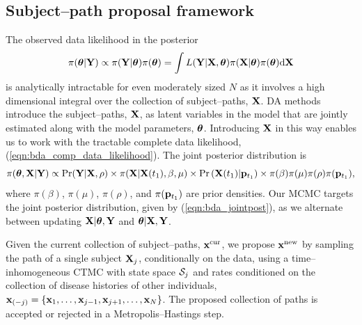 \subsection{Subject--path proposal framework}
\label{subsec:bda_subj_proc}
The observed data likelihood in the posterior  $$ \pi(\boldsymbol{\theta}|\mathbf{Y}) \propto \pi(\mathbf{Y}|\boldsymbol{\theta})\pi(\boldsymbol{\theta})=\int L(\mathbf{Y}|\mathbf{X}, \boldsymbol{\theta}) \pi(\mathbf{X}|\boldsymbol{\theta}) \pi(\boldsymbol{\theta}) \mathrm{d}\mathbf{X}$$
is analytically intractable for even moderately sized $ N $ as it involves a  high dimensional integral over the collection of subject--paths, $ \mathbf{X} $. DA methods introduce the subject--paths, $ \mathbf{X} $, as latent variables in the model that are jointly estimated along with the model parameters, $ \boldsymbol{\theta} $. Introducing $ \mathbf{X} $ in this way enables us to work with the tractable complete data likelihood, (\ref{eqn:bda_comp_data_likelihood}). The joint posterior distribution is \begin{equation}
\label{eqn:bda_jointpost}
\pi(\boldsymbol{\theta}, \mathbf{X}| \mathbf{Y}) \propto \Pr(\mathbf{Y}|\mathbf{X},\rho) \times\pi(\mathbf{X}|\mathbf{X}(t_1),\beta,\mu) \times \Pr\left (\mathbf{X}(t_1)|\mathbf{p}_{t_1}\right) \times\pi(\beta)\pi(\mu) \pi(\rho) \pi(\mathbf{p}_{t_1}),
\end{equation} where $ \pi(\beta)$, $\pi(\mu)$, $\pi(\rho)$, and $\pi(\mathbf{p}_{t_1}) $ are prior densities. Our MCMC targets the joint posterior distribution, given by (\ref{eqn:bda_jointpost}), as we alternate between updating $ \mathbf{X}|\boldsymbol{\theta},\mathbf{Y} $ and $ \boldsymbol{\theta}|\mathbf{X},\mathbf{Y} $. 

Given the current collection of subject--paths, $ \mathbf{x}^{\mathrm{cur}} $, we propose $ \mathbf{x}^{\mathrm{new}} $ by sampling the path of a single subject $\mathbf{X}_j$, conditionally on the data, using a time--inhomogeneous CTMC with state space $ \mathcal{S}_j  $ and rates conditioned on the collection of disease histories of other individuals, $ \mathbf{x}_{(-j)}  = \lbrace \mathbf{x}_1,\dots,\mathbf{x}_{j-1},\mathbf{x}_{j+1},\dots,\mathbf{x}_N \rbrace$. The proposed collection of paths is accepted or rejected in a Metropolis--Hastings step. 

